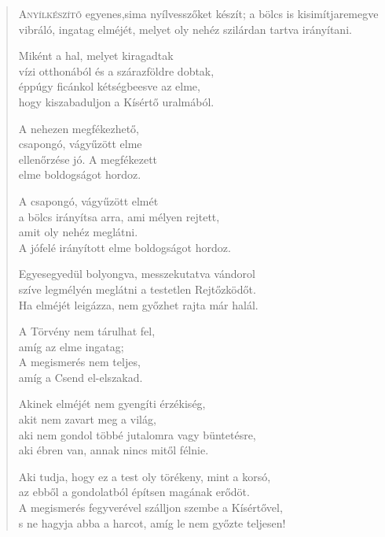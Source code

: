 
\begin{verse}

{\par%
\lettrine{A}{nyílkészítő} {\LettrineTextFont egyenes,}\newline sima nyílvesszőket készít;\newline
a bölcs is kisimítja\verselinebreak remegve vibráló, ingatag elméjét,\verselinebreak
melyet oly nehéz szilárdan tartva irányítani.
\par}

 Miként a hal, melyet kiragadtak\\
vízi otthonából és a szárazföldre dobtak,\\
éppúgy ficánkol kétségbeesve az elme,\\
hogy kiszabaduljon a Kísértő uralmából.

 A nehezen megfékezhető,\\
csapongó, vágyűzött elme\\
ellenőrzése jó. A megfékezett\\
elme boldogságot hordoz.

 A csapongó, vágyűzött elmét\\
a bölcs irányítsa arra, ami mélyen rejtett,\\
amit oly nehéz meglátni.\\
A jófelé irányított elme boldogságot hordoz.

 Egyesegyedül bolyongva, messzekutatva vándorol\\
szíve legmélyén meglátni a testetlen Rejtőzködőt.\\
Ha elméjét leigázza, nem győzhet rajta már halál.

 A Törvény nem tárulhat fel,\\
amíg az elme ingatag;\\
A megismerés nem teljes,\\
amíg a Csend el-elszakad.

 Akinek elméjét nem gyengíti érzékiség,\\
akit nem zavart meg a világ,\\
aki nem gondol többé jutalomra vagy büntetésre,\\
aki ébren van, annak nincs mitől félnie.

 Aki tudja, hogy ez a test oly törékeny, mint a korsó,\\
az ebből a gondolatból építsen magának erődöt.\\
A megismerés fegyverével szálljon szembe a Kísértővel,\\
s ne hagyja abba a harcot, amíg le nem győzte teljesen!


\end{verse}
